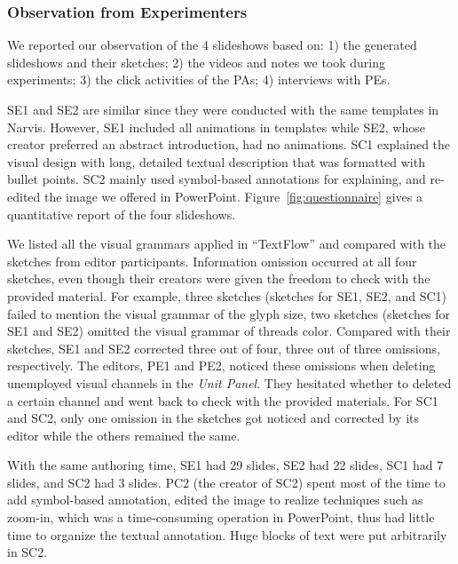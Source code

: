 \subsubsection{Observation from Experimenters}

We reported our observation of the 4 slideshows based on: 1) the generated slideshows and their sketches; 2) the videos and notes we took during experiments; 3) the click activities of the PAs; 4) interviews with PEs.

SE1 and SE2 are similar since they were conducted with the same templates in Narvis. However, SE1 included all animations in templates while SE2, whose creator preferred an abstract introduction, had no animations. 
SC1 explained the visual design with long, detailed textual description that was formatted with bullet points. SC2 mainly used symbol-based annotations for explaining, and re-edited the image we offered in PowerPoint. Figure~\ref{fig:questionnaire} gives a quantitative report of the four slideshows.

We listed all the visual grammars applied in ``TextFlow'' and compared with the sketches from editor participants. Information omission occurred at all four sketches, even though their creators were given the freedom to check with the provided material. For example, three sketches (sketches for SE1, SE2, and SC1) failed to mention the visual grammar of the glyph size, two sketches (sketches for SE1 and SE2) omitted the visual grammar of threads color. 
Compared with their sketches, SE1 and SE2 corrected three out of four, three out of three omissions, respectively. The editors, PE1 and PE2, noticed these omissions when deleting unemployed visual channels in the \textit{Unit Panel}. They hesitated whether to deleted a certain channel and went back to check with the provided materials.   
For SC1 and SC2, only one omission in the sketches got noticed and corrected by its editor while the others remained the same. 

With the same authoring time, SE1 had 29 slides, SE2 had 22 slides, SC1 had 7 slides, and SC2 had 3 slides. PC2 (the creator of SC2) spent most of the time to add symbol-based annotation, edited the image to realize techniques such as zoom-in, which was a time-consuming operation in PowerPoint, thus had little time to organize the textual annotation. Huge blocks of text were put arbitrarily in SC2.



